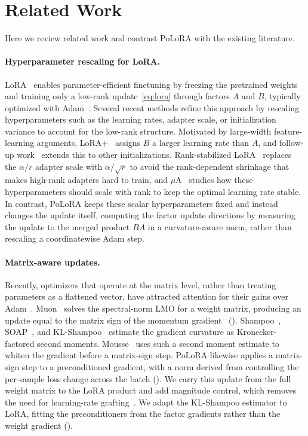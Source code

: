 \documentclass[11pt]{article}
\newcommand{\methodname}{PoLoRA\xspace}
\theoremstyle{plain}
\theoremstyle{definition}
\theoremstyle{remark}
\theoremstyle{definition}
\begin{document}
\section{Related Work}
\label{sec:related}

Here we review related work and contrast \methodname{} with the existing literature.


\paragraph{Hyperparameter rescaling for LoRA.}
LoRA~\cite{lora} enables parameter-efficient finetuning by freezing the pretrained
weights and training only a low-rank update~\eqref{eq:lora} through factors $A$ and
$B$, typically optimized with Adam~\cite{adam}. Several recent methods refine this
approach by rescaling hyperparameters such as the learning rates, adapter scale, or
initialization variance to account for the low-rank structure. Motivated by large-width
feature-learning arguments, LoRA+~\cite{loraplus} assigns $B$ a larger learning rate
than $A$, and follow-up work~\cite{hayou2024initialization, li2025beyond} extends this
to other initializations. Rank-stabilized LoRA~\cite{rslora} replaces the $\alpha/r$
adapter scale with $\alpha/\sqrt{r}$ to avoid the rank-dependent shrinkage that makes
high-rank adapters hard to train, and $\mu$A~\cite{mua} studies how these
hyperparameters should scale with rank to keep the optimal learning rate stable. In
contrast, \methodname{} keeps these scalar hyperparameters fixed and instead changes the update itself, computing the factor update directions by measuring the update to the merged product $BA$ in a curvature-aware norm, rather than rescaling a coordinatewise Adam step.

\paragraph{Matrix-aware updates.}
Recently, optimizers that operate at the matrix level, rather than treating parameters as
a flattened vector, have attracted attention for their gains over Adam~\cite{liu2025muon,
qiu2026hyperparameter, benchmark_practices}. Muon~\cite{muon} solves the spectral-norm LMO
for a weight matrix, producing an update equal to the matrix sign of the momentum
gradient~\cite{polarexpress} (). Shampoo~\cite{shampoo},
SOAP~\cite{soap}, and KL-Shampoo~\cite{klshampoo} estimate the gradient curvature as
Kronecker-factored second moments. Mousse~\cite{mousse} uses such a second moment estimate to
whiten the gradient before a matrix-sign step. \methodname{} likewise applies a matrix-sign step to a preconditioned gradient, with a norm derived from controlling the per-sample loss change across the batch (). We carry this update from the full weight matrix to the LoRA product and add magnitude control, which removes the need for learning-rate grafting~\cite{shi2023distributed, mousse}. We adapt the KL-Shampoo estimator to LoRA, fitting the preconditioners from the factor gradients rather than the weight gradient ().
\end{document}
